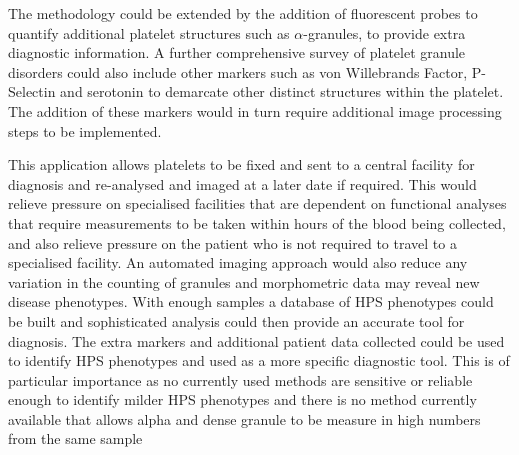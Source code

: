 The methodology could be extended by the addition of fluorescent probes to quantify additional platelet structures such as $\alpha$-granules, to provide extra diagnostic information. A further comprehensive survey of platelet granule disorders could also include other markers such as von Willebrands Factor, P-Selectin and serotonin to demarcate other distinct structures within the platelet. The addition of these markers would in turn require additional image processing steps to be implemented. 

This application allows platelets to be fixed and sent to a central facility for diagnosis and re-analysed and imaged at a later date if required. This would relieve pressure on specialised facilities that are dependent on functional analyses that require measurements to be taken within hours of the blood being collected, and also relieve pressure on the patient who is not required to travel to a specialised facility. An automated imaging approach would also reduce any variation in the counting of granules and morphometric data may reveal new disease phenotypes. With enough samples a database of HPS phenotypes could be built and sophisticated analysis could then provide an accurate tool for diagnosis. The extra markers and additional patient data collected could be used to identify HPS phenotypes and used as a more specific diagnostic tool. This is of particular importance as no currently used methods are sensitive or reliable enough to identify milder HPS phenotypes and there is no method currently available that allows alpha and dense granule to be measure in high numbers from the same sample
